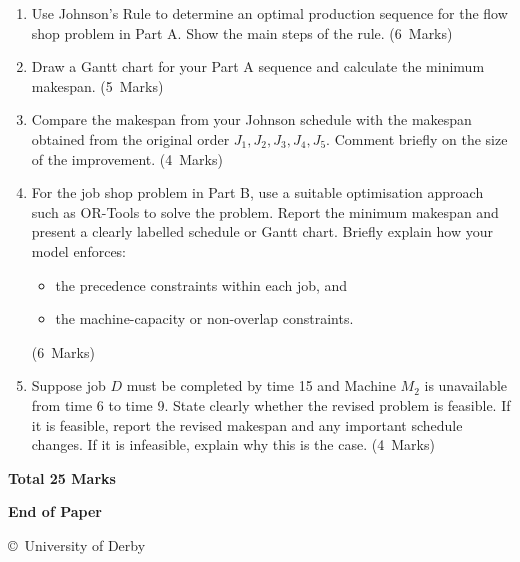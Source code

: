 \documentclass[11pt,a4paper]{article}
\newcommand{\markalloc}[1]{\nobreak\hfill\mbox{(#1 Marks)}}
\newcommand{\questiontotal}[1]{\begin{flushright}\textbf{Total #1 Marks}\end{flushright}}
\begin{document}
\begin{enumerate}
\item Use Johnson's Rule to determine an optimal production sequence for the flow shop problem in Part A. Show the main steps of the rule. \markalloc{6}

\item Draw a Gantt chart for your Part A sequence and calculate the minimum makespan. \markalloc{5}

\item Compare the makespan from your Johnson schedule with the makespan obtained from the original order $J_1,J_2,J_3,J_4,J_5$. Comment briefly on the size of the improvement. \markalloc{4}

\item For the job shop problem in Part B, use a suitable optimisation approach such as OR-Tools to solve the problem.
Report the minimum makespan and present a clearly labelled schedule or Gantt chart.
Briefly explain how your model enforces:
\begin{itemize}[leftmargin=0.9cm, itemsep=0.25em]
\item the precedence constraints within each job, and
\item the machine-capacity or non-overlap constraints.
\end{itemize}
\markalloc{6}

\item Suppose job $D$ must be completed by time 15 and Machine $M_2$ is unavailable from time 6 to time 9.
State clearly whether the revised problem is feasible.
If it is feasible, report the revised makespan and any important schedule changes.
If it is infeasible, explain why this is the case. \markalloc{4}
\end{enumerate}

\questiontotal{25}

\vfill

\begin{center}
\textbf{End of Paper}

\copyright\ University of Derby
\end{center}
\end{document}
